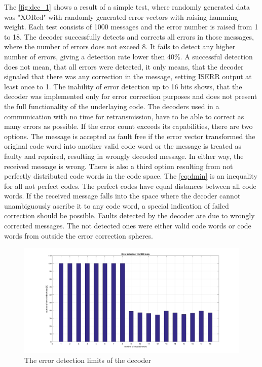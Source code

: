 The \autoref{fig:dec_1} shows a result of a simple test, where randomly generated data was "XORed" with randomly generated error vectors with raising hamming weight. Each test consists of 1000 messages and the error number is raised from 1 to 18. The decoder successfully detects and corrects all errors in those messages, where the number of errors does not exceed 8. It fails to detect any higher number of errors, giving a detection rate lower then 40\%. A successful detection does not mean, that all errors were detected, it only means, that the decoder signaled that there was any correction in the message, setting ISERR output at least once to 1.  The inability of error detection up to 16 bits shows, that the decoder was implemented only for error correction purposes and does not present the full functionality of the underlaying code. The decoders used in a communication with no time for retransmission, have to be able to correct as many errors as possible. If the error count exceeds its capabilities, there are two options. The message is accepted as fault free if the error vector transformed the original code word into another valid code word or the message is treated as faulty and repaired, resulting in wrongly decoded message. In either way, the received message is wrong. There is also a third option resulting from not perfectly distributed code words in the code space. The \autoref{eq:dmin} is an inequality for all not perfect codes. The perfect codes have equal distances between all code words. If the received message falls into the space where the decoder cannot unambiguously ascribe it to any code word, a special indication of failed correction should be possible. Faults detected by the decoder are due to wrongly corrected messages. The not detected ones were either valid code words or code words from outside the error correction spheres.

\begin{figure}[h]
\centering
\includegraphics[width=\textwidth]{figures/1000_tests_error_detection.png}
\caption{The error detection limits of the decoder}
\label{fig:dec_1}
\end{figure}

